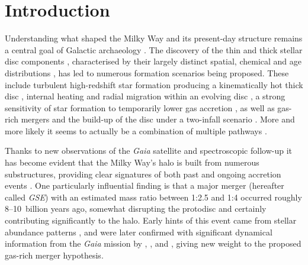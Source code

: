 \documentclass[fleqn,usenatbib]{mnras}
\begin{document}
\section{Introduction}
\label{sec:introduction}

Understanding what shaped the Milky Way and its present-day structure remains a central goal of Galactic archaeology \citep{FreemanBlandHawthorn2002,BlandHawthorn_Gerhard2016}. The discovery of the thin and thick stellar disc components \citep{Yoshii1982, Gilmore1983}, characterised by their largely distinct spatial, chemical and age distributions \citep[for example][]{Bensby2014, Hayden2015}, has led to numerous formation scenarios being proposed. These include turbulent high-redshift star formation producing a kinematically hot thick disc \citep{Bird2013, Stinson2013}, internal heating and radial migration within an evolving disc \citep{Schoenrich2009, Minchev2013, Sharma2021b}, a strong sensitivity of star formation to temporarily lower gas accretion \citep{Grand2018, Orkney2025}, as well as gas-rich mergers \citep{Brook2004, Buck2020} and the build-up of the disc under a two-infall scenario \citep{Chiappini1997, Spitoni2019}. More and more likely it seems to actually be a combination of multiple pathways \citep[e.g.][]{Orkney2025}.

Thanks to new observations of the \textit{Gaia} satellite \citep{Brown2021b} and spectroscopic follow-up it has become evident that the Milky Way's halo is built from numerous substructures, providing clear signatures of both past and ongoing accretion events \citep{Belokurov2006, Myeong2018c, Koppelman2019, Naidu2020, Yuan2020, Dodd2023}. One particularly influential finding is that a major merger (hereafter called \textit{GSE}) with an estimated mass ratio between 1:2.5 and 1:4 \citep{Helmi2018, Naidu2020} occurred roughly 8–10~billion years ago, somewhat disrupting the protodisc and certainly contributing significantly to the halo. Early hints of this event came from stellar abundance patterns \citep{Nissen2010}, and were later confirmed with significant dynamical information from the \textit{Gaia} mission \citep{Brown2016, Brown2018} by \citet{Belokurov2018}, \citet{Haywood2018b}, and \citet{Helmi2018}, giving new weight to the proposed gas-rich merger hypothesis.
\end{document}

